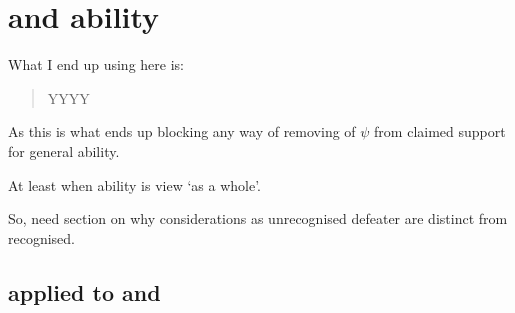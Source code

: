 




\newpage

\section{\nI{} and ability}
\label{sec:ni-ability}

\begin{note}
  \color{red}
  What I end up using here is:

  \begin{quote}
    \vspace{-\baselineskip}
    {\color{red} YYYY}
  \end{quote}
  As this is what ends up blocking any way of removing \expec{} of \(\psi\) from claimed support for general ability.

  At least when ability is view `as a whole'.

  So, need section on why considerations as unrecognised defeater are distinct from recognised.
\end{note}

\subsection{\nI{} applied to \gsi{} and \adA{}}
\label{sec:ni-ability:adA}

